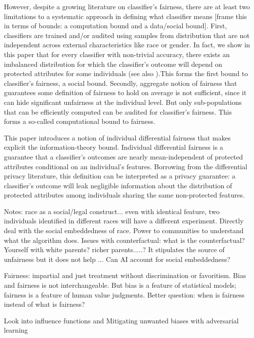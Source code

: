 \documentclass{article}
\begin{document}
\bigskip
However, despite a growing literature on classifier's fairness, there are at least two limitations to a systematic approach in defining what classifier means [frame this in terms of bounds: a computation bound and a data/social bound]. First, classifiers are trained and/or audited using samples from distribution that are not independent across external characteristics like race or gender. In fact, we show in this paper that for every classifier with non-trivial accuracy, there exists an imbalanced distribution for which the classifier's outcome will depend on protected attributes for some individuals (see also \cite{kleinberg2016inherent}).This forms the first bound to classifier's fairness, a social bound. Secondly, aggregate notion of fairness that guarantees some definition of fairness to hold on average is not sufficient, since it can hide significant unfairness at the individual level. But only sub-populations that can be efficiently computed can be audited for classifier's fairness. This forms a so-called computational bound to fairness.

\bigskip
This paper introduces a notion of individual differential fairness that makes explicit the information-theory bound. Individual differential fairness is a guarantee that a classifier's outcomes are nearly mean-independent of protected attributes conditional on an individual's features. Borrowing from the differential privacy literature, this definition can be interpreted as a privacy guarantee: a classifier's outcome will leak negligible information about the distribution of protected attributes among individuals sharing the same non-protected features. 


Notes: race as a social/legal construct... even with identical feature, two individuals identified in different races will have a different experiment. Directly deal with the social embeddedness of race. Power to communities to understand what the algorithm does. Issues with counterfactual: what is the counterfactual? Yourself with white parents? richer parents.....? It stipulates the source of unfairness but it does not help ... Can AI account for social embeddedness?

Fairness: impartial and just treatment without discrimination or favoritism. Bias and fairness is not interchangeable. But bias is a feature of statistical models; fairness is a feature of human value judgments. Better question: when is fairness instead of what is fairness? 

Look into influence functions and Mitigating unwanted biases with adversarial learning
\end{document}
